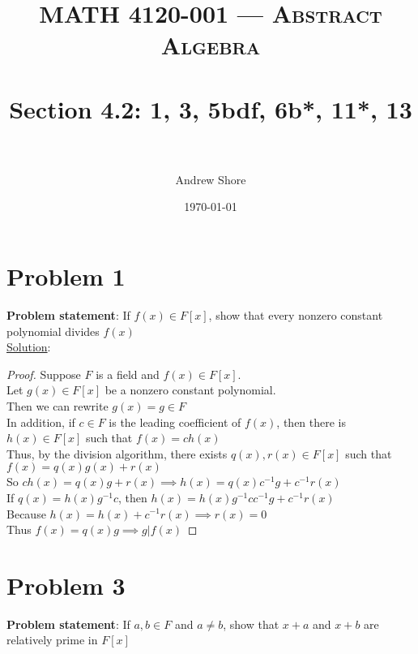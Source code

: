 \documentclass{article} %
\title{ 
\normalfont \normalsize 
\textsc{MATH 4120-001 --- Abstract Algebra} \\
\horrule{0.5pt} \\[0cm] %
\huge Section 4.2: 1, 3, 5bdf, 6b*, 11*, 13 \\ %
\horrule{2pt} \\[0cm] %
}
\author{Andrew Shore} %
\date{\normalsize\today} %
\begin{document}
\maketitle %

\section*{Problem 1}
\textbf{Problem statement}: If $f(x) \in F[x]$, show that every nonzero constant polynomial divides $f(x)$
\\

\underline{Solution}: 
\begin{addmargin}[1em]{0em}
\begin{proof}
Suppose $F$ is a field and $f(x) \in F[x]$.
\\Let $g(x) \in F[x]$ be a nonzero constant polynomial.
\\Then we can rewrite $g(x) = g \in F$
\\In addition, if $c \in F$ is the leading coefficient of $f(x)$, then there is $h(x) \in F[x]$ such that $f(x) = ch(x)$
\\Thus, by the division algorithm, there exists $q(x), r(x) \in F[x]$ such that $f(x) = q(x)g(x) + r(x)$
\\So $ch(x) = q(x)g + r(x) \implies h(x) = q(x)c^{-1}g + c^{-1}r(x)$
\\If $q(x) = h(x)g^{-1}c$, then $h(x) = h(x)g^{-1}cc^{-1}g + c^{-1}r(x)$
\\Because $h(x) = h(x) + c^{-1}r(x) \implies r(x) = 0$
\\Thus $f(x) = q(x)g \implies g|f(x)$
\end{proof}
\end{addmargin}
\newpage
\section*{Problem 3}
\textbf{Problem statement}: If $a,b \in F$ and $a \neq b$, show that $x + a$ and $x + b$ are relatively prime in $F[x]$
\\
\end{document}
